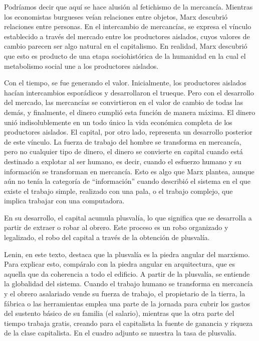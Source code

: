 \documentclass[
  a4paper,
]{article}
\begin{document}
Podríamos decir que aquí se hace alusión al fetichismo de la mercancía.
Mientras los economistas burgueses veían relaciones entre objetos, Marx
descubrió relaciones entre personas. En el intercambio de mercancías, se
expresa el vínculo establecido a través del mercado entre los
productores aislados, cuyos valores de cambio parecen ser algo natural
en el capitalismo. En realidad, Marx descubrió que esto es producto de
una etapa sociohistórica de la humanidad en la cual el metabolismo
social une a los productores aislados.

Con el tiempo, se fue generando el valor. Inicialmente, los productores
aislados hacían intercambios esporádicos y desarrollaron el trueque.
Pero con el desarrollo del mercado, las mercancías se convirtieron en el
valor de cambio de todas las demás, y finalmente, el dinero cumplió esta
función de manera máxima. El dinero unió indisolublemente en un todo
único la vida económica completa de los productores aislados. El
capital, por otro lado, representa un desarrollo posterior de este
vínculo. La fuerza de trabajo del hombre se transforma en mercancía,
pero no cualquier tipo de dinero, el dinero se convierte en capital
cuando está destinado a explotar al ser humano, es decir, cuando el
esfuerzo humano y su información se transforman en mercancía. Esto es
algo que Marx plantea, aunque aún no tenía la categoría de
``información'' cuando describió el sistema en el que existe el trabajo
simple, realizado con una pala, o el trabajo complejo, que implica
trabajar con una computadora.

En su desarrollo, el capital acumula plusvalía, lo que significa que se
desarrolla a partir de extraer o robar al obrero. Este proceso es un
robo organizado y legalizado, el robo del capital a través de la
obtención de plusvalía.

Lenin, en este texto, destaca que la plusvalía es la piedra angular del
marxismo. Para explicar esto, compáralo con la piedra angular en
arquitectura, que es aquella que da coherencia a todo el edificio. A
partir de la plusvalía, se entiende la globalidad del sistema. Cuando el
trabajo humano se transforma en mercancía y el obrero asalariado vende
su fuerza de trabajo, el propietario de la tierra, la fábrica o las
herramientas emplea una parte de la jornada para cubrir los gastos del
sustento básico de su familia (el salario), mientras que la otra parte
del tiempo trabaja gratis, creando para el capitalista la fuente de
ganancia y riqueza de la clase capitalista. En el cuadro adjunto se
muestra la tasa de plusvalía.
\end{document}

